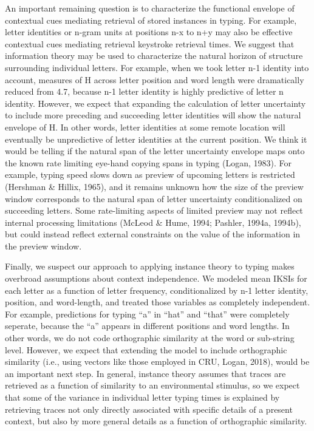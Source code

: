 \documentclass[,man,floatsintext]{apa6}
\begin{document}
An important remaining question is to characterize the functional envelope of contextual cues mediating retrieval of stored instances in typing. For example, letter identities or n-gram units at positions n-x to n+y may also be effective contextual cues mediating retrieval keystroke retrieval times. We suggest that information theory may be used to characterize the natural horizon of structure surrounding individual letters. For example, when we took letter n-1 identity into account, measures of H across letter position and word length were dramatically reduced from 4.7, because n-1 letter identity is highly predictive of letter n identity. However, we expect that expanding the calculation of letter uncertainty to include more preceding and succeeding letter identities will show the natural envelope of H. In other words, letter identities at some remote location will eventually be unpredictive of letter identities at the current position. We think it would be telling if the natural span of the letter uncertainty envelope maps onto the known rate limiting eye-hand copying spans in typing (Logan, 1983). For example, typing speed slows down as preview of upcoming letters is restricted (Hershman \& Hillix, 1965), and it remains unknown how the size of the preview window corresponds to the natural span of letter uncertainty conditionalized on succeeding letters. Some rate-limiting aspects of limited preview may not reflect internal processing limitations (McLeod \& Hume, 1994; Pashler, 1994a, 1994b), but could instead reflect external constraints on the value of the information in the preview window.

Finally, we suspect our approach to applying instance theory to typing makes overbroad assumptions about context independence. We modeled mean IKSIs for each letter as a function of letter frequency, conditionalized by n-1 letter identity, position, and word-length, and treated those variables as completely independent. For example, predictions for typing \enquote{a} in \enquote{hat} and \enquote{that} were completely seperate, because the \enquote{a} appears in different positions and word lengths. In other words, we do not code orthographic similarity at the word or sub-string level. However, we expect that extending the model to include orthographic similarity (i.e., using vectors like those employed in CRU, Logan, 2018), would be an important next step. In general, instance theory assumes that traces are retrieved as a function of similarity to an environmental stimulus, so we expect that some of the variance in individual letter typing times is explained by retrieving traces not only directly associated with specific details of a present context, but also by more general details as a function of orthographic similarity.
\end{document}
